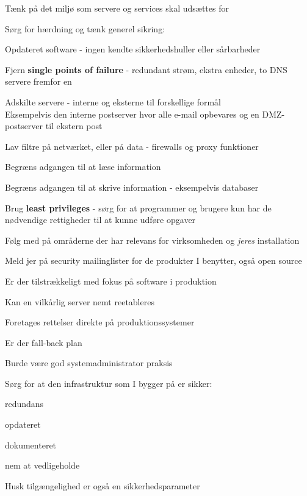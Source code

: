 \documentclass[Screen16to9,17pt]{foils}
\begin{document}

\begin{list1}
\item Tænk på det miljø som servere og services skal udsættes for
\item Sørg for hærdning og tænk generel sikring:
  \begin{list2}
  \item Opdateret software - ingen kendte sikkerhedshuller eller
  sårbarheder
\item Fjern {\bfseries single points of failure} - redundant strøm, ekstra enheder, to DNS servere fremfor en
\item Adskilte servere - interne og eksterne til forskellige formål\\
Eksempelvis den interne postserver hvor alle e-mail opbevares og en
DMZ-postserver til ekstern post
\item Lav filtre på netværket, eller på data - firewalls og proxy
  funktioner
\item Begræns adgangen til at læse information
\item Begræns adgangen til at skrive information - eksempelvis databaser
\item Brug {\bfseries least privileges} - sørg for at programmer og brugere
  kun har de nødvendige rettigheder til at kunne udføre opgaver
\item Følg med på områderne der har relevans for virksomheden og
  \emph{jeres} installation
  \end{list2}
  \item Meld jer på security mailinglister for de produkter I benytter, også open source
\end{list1}



\begin{list1}
\item Er der tilstrækkeligt med fokus på software i produktion
\item Kan en vilkårlig server nemt reetableres
\item Foretages rettelser direkte på produktionssystemer
\item Er der fall-back plan
\item Burde være god systemadministrator praksis
\end{list1}




\begin{list1}
\item Sørg for at den infrastruktur som I bygger på er sikker:
\begin{list2}
 \item redundans
       \item opdateret
        \item dokumenteret
        \item nem at vedligeholde
\end{list2}

\item  Husk tilgængelighed er også en sikkerhedsparameter
\end{list1}
\end{document}
